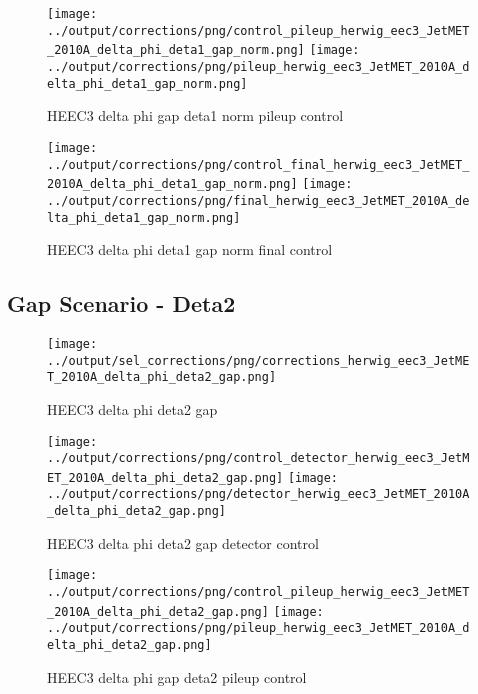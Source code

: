 \documentclass[11pt]{book}
\begin{document}
\begin{figure}[ht]
\centering
\texttt{[image: ../output/corrections/png/control\_pileup\_herwig\_eec3\_JetMET\_2010A\_delta\_phi\_deta1\_gap\_norm.png]}
\texttt{[image: ../output/corrections/png/pileup\_herwig\_eec3\_JetMET\_2010A\_delta\_phi\_deta1\_gap\_norm.png]}
\caption{HEEC3 delta phi gap deta1 norm pileup control}
\label{fig:HEEC3_JetMET_2010A_delta_phi_deta1_gap_norm_pileup_control}
\end{figure}


\begin{figure}[ht]
\centering
\texttt{[image: ../output/corrections/png/control\_final\_herwig\_eec3\_JetMET\_2010A\_delta\_phi\_deta1\_gap\_norm.png]}
\texttt{[image: ../output/corrections/png/final\_herwig\_eec3\_JetMET\_2010A\_delta\_phi\_deta1\_gap\_norm.png]}
\caption{HEEC3 delta phi deta1 gap norm final control}
\label{fig:HEEC3_JetMET_2010A_delta_phi_deta1_gap_norm_final_control}
\end{figure}


\clearpage
\subsection{Gap Scenario - Deta2}
\begin{figure}[ht]
\centering
\texttt{[image: ../output/sel\_corrections/png/corrections\_herwig\_eec3\_JetMET\_2010A\_delta\_phi\_deta2\_gap.png]}
\caption{HEEC3 delta phi deta2 gap}
\label{fig:HEEC3_JetMET_2010A_delta_phi_deta2_gap}
\end{figure}

\begin{figure}[ht]
\centering
\texttt{[image: ../output/corrections/png/control\_detector\_herwig\_eec3\_JetMET\_2010A\_delta\_phi\_deta2\_gap.png]}
\texttt{[image: ../output/corrections/png/detector\_herwig\_eec3\_JetMET\_2010A\_delta\_phi\_deta2\_gap.png]}
\caption{HEEC3 delta phi deta2 gap detector control}
\label{fig:HEEC3_JetMET_2010A_delta_phi_deta2_gap_detector_control}
\end{figure}

\begin{figure}[ht]
\centering
\texttt{[image: ../output/corrections/png/control\_pileup\_herwig\_eec3\_JetMET\_2010A\_delta\_phi\_deta2\_gap.png]}
\texttt{[image: ../output/corrections/png/pileup\_herwig\_eec3\_JetMET\_2010A\_delta\_phi\_deta2\_gap.png]}
\caption{HEEC3 delta phi gap deta2 pileup control}
\label{fig:HEEC3_JetMET_2010A_delta_phi_deta2_gap_pileup_control}
\end{figure}
\end{document}
